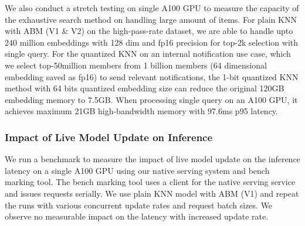 

We also conduct a stretch testing on single A100 GPU to measure the capacity of the exhaustive search method on handling large amount of items. For plain KNN with ABM (V1 \& V2) on the high-pass-rate dataset, we are able to handle upto 240 million embeddings with 128 dim and fp16 precision for top-2k selection with single query. For the quantized KNN on an internal notification use case, which we select top-50million members from 1 billion members (64 dimensional embedding saved as fp16) to send relevant notifications, the 1-bit quantized KNN method with 64 bits quantized embedding size can reduce the original 120GB embedding memory to 7.5GB. When processing single query on an A100 GPU, it achieves maximum 21GB high-bandwidth memory with 97.6ms p95 latency.

\subsubsection{Impact of Live Model Update on Inference}\label{sec:low-pass}
We run a benchmark to measure the impact of live model update on the inference latency on a single A100 GPU using our native serving system and bench marking tool. The bench marking tool uses a client for the native serving service and issues requests serially. We use plain KNN model with ABM (V1) and repeat the runs with various concurrent update rates and request batch sizes. We observe no measurable impact on the latency with increased update rate.

